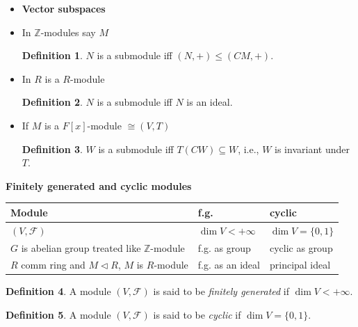 \documentclass[11pt]{article}
\theoremstyle{definition}
\newtheorem{definition}{Definition}[section]
\theoremstyle{remark}
\begin{document}
\begin{itemize}
    \item \textbf{Vector subspaces}

    \item In $\mathbb{Z}$-modules say $M$
    \begin{definition}\label{def:submodule_z}
        $N$ is a submodule iff $(N, +) \leq (CM, +)$.
    \end{definition}

    \item In $R$ is a $R$-module
    \begin{definition}\label{def:submodule_ring}
        $N$ is a submodule iff $N$ is an ideal.
    \end{definition}

    \item If $M$ is a $F[x]$-module $\cong (V, T)$
    \begin{definition}\label{def:submodule_fx}
        $W$ is a submodule iff $T(CW) \subseteq W$, i.e., $W$ is invariant under $T$.
    \end{definition}
\end{itemize}

\begin{center}
\textbf{Finitely generated and cyclic modules}
\end{center}

\begin{table}[h]
\begin{tabular}{|p{4cm}|p{4cm}|p{4cm}|}
\hline
\textbf{Module} & \textbf{f.g.} & \textbf{cyclic} \\
\hline
$(V, \mathcal{F})$ & $\dim V < +\infty$ & $\dim V = \{0, 1\}$ \\
\hline
$G$ is abelian group treated like $\mathbb{Z}$-module & f.g. as group & cyclic as group \\
\hline
$R$ comm ring and $M \triangleleft R$, $M$ is $R$-module & f.g. as an ideal & principal ideal \\
\hline
\end{tabular}
\end{table}

\begin{definition}\label{def:finitely_generated_module}
A module $(V, \mathcal{F})$ is said to be \textit{finitely generated} if $\dim V < +\infty$.
\end{definition}

\begin{definition}\label{def:cyclic_module}
A module $(V, \mathcal{F})$ is said to be \textit{cyclic} if $\dim V = \{0, 1\}$.
\end{definition}
\end{document}
